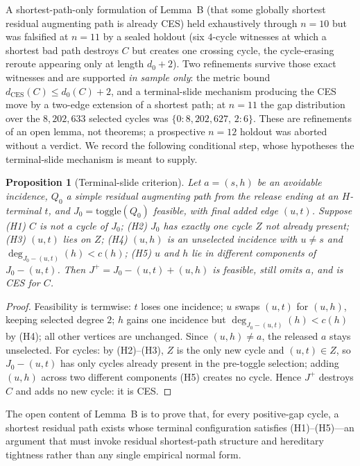\documentclass[11pt]{article}
\theoremstyle{plain}
\newtheorem{proposition}[theorem]{Proposition}
\theoremstyle{definition}
\begin{document}
A shortest-path-only formulation of Lemma~B (that some globally shortest residual
augmenting path is already CES) held exhaustively through $n=10$ but was
falsified at $n=11$ by a sealed holdout (six $4$-cycle witnesses at which a
shortest bad path destroys $C$ but creates one crossing cycle, the cycle-erasing
reroute appearing only at length $d_0+2$). Two refinements survive those exact
witnesses and are supported \emph{in sample only}: the metric bound
$d_{\mathrm{CES}}(C)\le d_0(C)+2$, and a terminal-slide mechanism producing the
CES move by a two-edge extension of a shortest path; at $n=11$ the gap
distribution over the $8{,}202{,}633$ selected cycles was $\{0:8{,}202{,}627,\,
2:6\}$. These are refinements of an open lemma, not theorems; a prospective
$n=12$ holdout was aborted without a verdict. We record the following conditional
step, whose hypotheses the terminal-slide mechanism is meant to supply.

\begin{proposition}[Terminal-slide criterion]\label{prop:B1}
Let $a=(s,h)$ be an avoidable incidence, $Q_0$ a simple residual augmenting path
from the release ending at an $H$-terminal $t$, and $J_0=\mathrm{toggle}(Q_0)$
feasible, with final added edge $(u,t)$. Suppose (H1) $C$ is not a cycle of
$J_0$; (H2) $J_0$ has exactly one cycle $Z$ not already present; (H3) $(u,t)$
lies on $Z$; (H4) $(u,h)$ is an unselected incidence with $u\ne s$ and
$\deg_{J_0-(u,t)}(h)<c(h)$; (H5) $u$ and $h$ lie in different components of
$J_0-(u,t)$. Then $J^+=J_0-(u,t)+(u,h)$ is feasible, still omits $a$, and is CES
for $C$.
\end{proposition}

\begin{proof}
Feasibility is termwise: $t$ loses one incidence; $u$ swaps $(u,t)$ for $(u,h)$,
keeping selected degree $2$; $h$ gains one incidence but $\deg_{J_0-(u,t)}(h)
<c(h)$ by (H4); all other vertices are unchanged. Since $(u,h)\ne a$, the released
$a$ stays unselected. For cycles: by (H2)--(H3), $Z$ is the only new cycle and
$(u,t)\in Z$, so $J_0-(u,t)$ has only cycles already present in the pre-toggle
selection; adding $(u,h)$ across two different components (H5) creates no cycle.
Hence $J^+$ destroys $C$ and adds no new cycle: it is CES.
\end{proof}

The open content of Lemma~B is to prove that, for every positive-gap cycle, a
shortest residual path exists whose terminal configuration satisfies
(H1)--(H5)---an argument that must invoke residual shortest-path structure and
hereditary tightness rather than any single empirical normal form.
\end{document}
